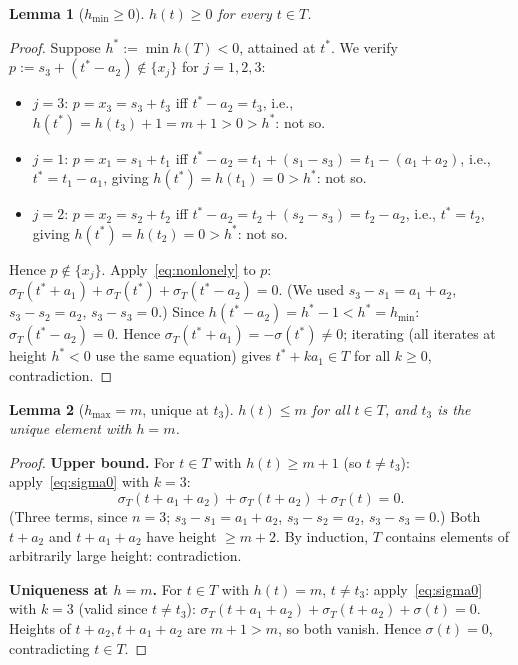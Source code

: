 \documentclass{article}
\newtheorem{lemma}{Lemma}
\begin{document}
\begin{lemma}[$h_{\min}\ge 0$]\label{lem:betamin}
$h(t)\ge 0$ for every $t\in T$.
\end{lemma}
\begin{proof}
Suppose $h^*:=\min h(T)<0$, attained at $t^*$.
We verify $p:=s_3+(t^*-a_2)\notin\{x_j\}$ for $j=1,2,3$:
\begin{itemize}
\item $j=3$: $p=x_3=s_3+t_3$ iff $t^*-a_2=t_3$, i.e., $h(t^*)=h(t_3)+1=m+1>0>h^*$: not so.
\item $j=1$: $p=x_1=s_1+t_1$ iff $t^*-a_2=t_1+(s_1-s_3)=t_1-(a_1+a_2)$, i.e.,
  $t^*=t_1-a_1$, giving $h(t^*)=h(t_1)=0>h^*$: not so.
\item $j=2$: $p=x_2=s_2+t_2$ iff $t^*-a_2=t_2+(s_2-s_3)=t_2-a_2$, i.e., $t^*=t_2$,
  giving $h(t^*)=h(t_2)=0>h^*$: not so.
\end{itemize}
Hence $p\notin\{x_j\}$.  Apply~\eqref{eq:nonlonely} to $p$:
$\sigma_T(t^*+a_1)+\sigma_T(t^*)+\sigma_T(t^*-a_2)=0$.
(We used $s_3-s_1=a_1+a_2$, $s_3-s_2=a_2$, $s_3-s_3=0$.)
Since $h(t^*-a_2)=h^*-1<h^*=h_{\min}$: $\sigma_T(t^*-a_2)=0$.
Hence $\sigma_T(t^*+a_1)=-\sigma(t^*)\ne 0$; iterating (all iterates at height $h^*<0$ use the same equation) gives $t^*+ka_1\in T$ for all $k\ge 0$, contradiction.
\end{proof}

\begin{lemma}[$h_{\max}=m$, unique at $t_3$]\label{lem:betamax}
$h(t)\le m$ for all $t\in T$, and $t_3$ is the unique element with $h=m$.
\end{lemma}
\begin{proof}
\textbf{Upper bound.}
For $t\in T$ with $h(t)\ge m+1$ (so $t\ne t_3$): apply~\eqref{eq:sigma0} with $k=3$:
\[
  \sigma_T(t+a_1+a_2)+\sigma_T(t+a_2)+\sigma_T(t)=0.
\]
(Three terms, since $n=3$; $s_3-s_1=a_1+a_2$, $s_3-s_2=a_2$, $s_3-s_3=0$.)
Both $t+a_2$ and $t+a_1+a_2$ have height $\ge m+2$.
By induction, $T$ contains elements of arbitrarily large height: contradiction.

\textbf{Uniqueness at $h=m$.}
For $t\in T$ with $h(t)=m$, $t\ne t_3$: apply~\eqref{eq:sigma0} with $k=3$
(valid since $t\ne t_3$):
$\sigma_T(t+a_1+a_2)+\sigma_T(t+a_2)+\sigma(t)=0$.
Heights of $t+a_2,t+a_1+a_2$ are $m+1>m$, so both vanish.
Hence $\sigma(t)=0$, contradicting $t\in T$.
\end{proof}
\end{document}
